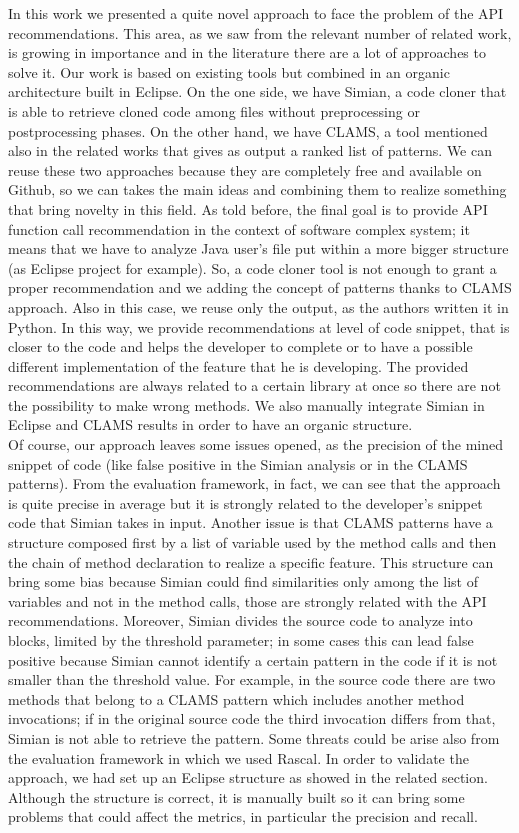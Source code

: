In this work we presented a quite novel approach to face the problem of the API recommendations. This area, as we saw from the relevant number of related work, is growing in importance and in the literature there are a lot of approaches to solve it. Our work is based on existing tools but combined in an organic architecture built in Eclipse. On the one side, we have Simian, a  code cloner that is able to retrieve cloned code among files without preprocessing or postprocessing phases. On the other hand, we have CLAMS, a tool mentioned also in the related works that gives as output a ranked list of patterns. We can reuse these two approaches because they are completely free and available on Github, so we can takes the main ideas and combining them to realize something that bring novelty in this field. As told before, the final goal is to provide API function call recommendation in the context of software complex system; it means that we have to analyze Java user's file put within a more bigger structure (as Eclipse project for example). So, a code cloner tool is not enough to grant a proper recommendation and we adding the concept of patterns thanks to CLAMS approach. Also in this case, we reuse only the output, as the authors written it in Python. In this way, we provide recommendations at level of code snippet, that is closer to the code and helps the developer to complete or to have a possible different implementation of the feature that he is developing. The provided recommendations are always related to a certain library at once so there are not the possibility to make wrong methods. We also manually integrate Simian in Eclipse and CLAMS results in order to have an organic structure. \\
Of course, our approach leaves some issues opened, as the precision of the mined snippet of code (like false positive in the Simian analysis or in the CLAMS patterns). From the evaluation framework, in fact, we can see that the approach is quite precise in average but it is strongly related to the developer's snippet code that Simian takes in input. Another issue is that CLAMS patterns have a structure composed first by a list of variable used by the method calls and then the chain of method declaration to realize a specific feature. This structure can bring some bias because Simian could find similarities only among the list of variables and not in the method calls, those are strongly related with the API recommendations. Moreover, Simian divides the source code to analyze into blocks, limited by the threshold parameter; in some cases this can lead false positive because Simian cannot identify a certain pattern in the code if it is not smaller than the threshold value. For example, in the source code there are two methods that belong to a CLAMS pattern which includes another method invocations; if in the original source code the third invocation differs from that, Simian is not able to retrieve the pattern. Some threats could be arise also from the evaluation framework in which we used Rascal. In order to validate the approach, we had set up an Eclipse structure as showed in the related section. Although the structure is correct, it is manually built so it can bring some problems that could affect the metrics, in particular the precision and recall. \\
